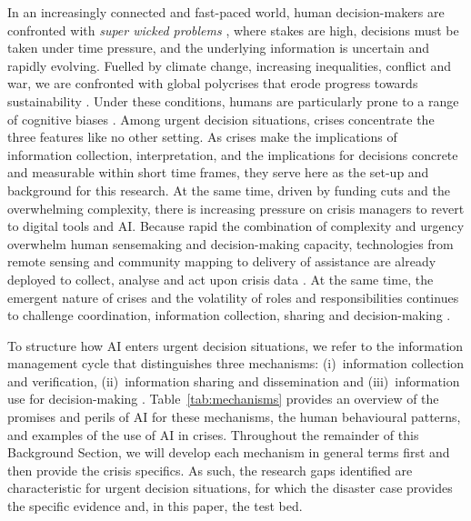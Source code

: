 \documentclass[pdflatex,sn-basic]{sn-jnl}
\begin{document}
In an increasingly connected and fast-paced world, human decision-makers are confronted with \textit{super wicked problems} \cite{levin2012overcoming}, where stakes are high, decisions must be taken under time pressure, and the underlying information is uncertain and rapidly evolving. Fuelled by climate change, increasing inequalities,
conflict and war, we are confronted with global polycrises that erode
progress towards sustainability \citep{jorgensen2024evolution}. Under these conditions, humans are particularly prone to a range of cognitive biases \citep{klein2010rapid}. Among urgent decision situations, crises concentrate the
three features like no other setting. As crises make the implications of information collection, interpretation, and the implications for decisions concrete and measurable within short time frames, they serve here as the set-up and background for this research. At the same time, driven by funding cuts and the overwhelming complexity, there is increasing pressure on crisis managers to revert to digital tools and AI. Because rapid the combination of complexity and urgency overwhelm human sensemaking and decision-making capacity, technologies from remote sensing and community mapping to delivery of assistance are already deployed to collect, analyse and act upon crisis data
\citep{qadir2016crisis,voigt2007satellite,champlin2023measuring,soden2014crowdsourced,coughlandeperez2015forecast}. At the same time, the emergent nature of crises and the volatility of roles and responsibilities continues to challenge coordination, information collection, sharing and decision-making \citep{nespeca2020towards,turoff2004design, comes, comes2026sensemaking, margherita2026artificial}. 

To structure how AI enters urgent decision situations, we refer to the information management cycle that distinguishes three mechanisms: (i)~information collection and verification, (ii)~information sharing
and dissemination and (iii)~information use for decision-making
\citep{comes2020coordination}.  Table~\ref{tab:mechanisms} provides an overview of the promises and perils of AI for these mechanisms, the human behavioural
patterns, and examples of the use of AI in crises. Throughout the remainder of this Background Section, we will develop each mechanism in general terms first and then provide the crisis specifics. As such, the
research gaps identified are characteristic for urgent decision situations, for which the disaster case provides the specific evidence and, in this paper, the test bed.
 
\end{document}
